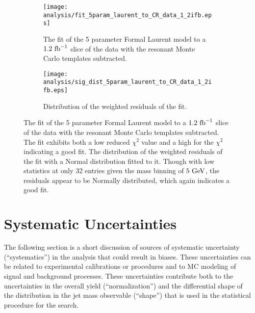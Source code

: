 \begin{figure}[htbp]
 \centering
 \begin{subfigure}[t]{0.48\textwidth}
  \centering
  \texttt{[image: analysis/fit\_5param\_laurent\_to\_CR\_data\_1\_2ifb.eps]}
  \caption[The fit of the 5 parameter Formal Laurent model to a slice of the \CRQCD{} data.]{%
   The fit of the 5 parameter Formal Laurent model to a $1.2~\mathrm{fb}^{-1}$ slice of the \CRQCD{} data with the resonant Monte Carlo templates subtracted.}
  \label{fig:fit_5param_laurent_to_CR_data_1_2ifb}
 \end{subfigure}%
 \quad
 \begin{subfigure}[t]{0.48\textwidth}
  \centering
  \texttt{[image: analysis/sig\_dist\_5param\_laurent\_to\_CR\_data\_1\_2ifb.eps]}
  \caption[Distribution of the weighted residuals of the fit.]{%
   Distribution of the weighted residuals of the fit.}
  \label{fig:sig_dist_5param_laurent_to_CR_data_1_2ifb}
 \end{subfigure}%
 \caption[The fit and fit residuals of the 5 parameter Formal Laurent model to a slice of the \CRQCD{} data.]{%
  The fit of the 5 parameter Formal Laurent model to a $1.2~\mathrm{fb}^{-1}$ slice of the \CRQCD{} data with the resonant Monte Carlo templates subtracted.
  The fit exhibits both a low reduced $\chi^{2}$ value and a high \pvalue{} for the $\chi^{2}$ indicating a good fit.
  The distribution of the weighted residuals of the fit with a Normal distribution fitted to it.
  Though with low statistics at only 32 entries given the mass binning of $5~\mathrm{GeV}$, the residuals appear to be Normally distributed, which again indicates a good fit.}
 \label{fig:5param_QCD_model_fit_laurent}
\end{figure}

\clearpage
\section{Systematic Uncertainties}\label{sec:systematic_uncertainties}

The following section is a short discussion of sources of systematic uncertainty (``systematics'') in the analysis that could result in biases.
These uncertainties can be related to experimental calibrations or procedures and to MC modeling of signal and background processes.
These uncertainties contribute both to the uncertainties in the overall yield (``normalization'') and the differential shape of the distribution in the \largeR{} jet mass observable (``shape'') that is used in the statistical procedure for the search.

